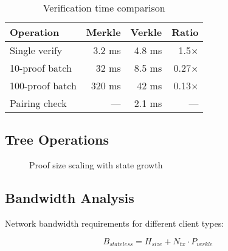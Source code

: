 \documentclass[11pt,a4paper]{article}
\theoremstyle{definition}
\begin{document}
\begin{table}[H]
\centering
\begin{tabular}{@{}lrrr@{}}
\toprule
\textbf{Operation} & \textbf{Merkle} & \textbf{Verkle} & \textbf{Ratio} \\
\midrule
Single verify & 3.2 ms & 4.8 ms & 1.5× \\
10-proof batch & 32 ms & 8.5 ms & 0.27× \\
100-proof batch & 320 ms & 42 ms & 0.13× \\
Pairing check & — & 2.1 ms & — \\
\bottomrule
\end{tabular}
\caption{Verification time comparison}
\label{tab:verification-time}
\end{table}

\subsection{Tree Operations}

\begin{figure}[H]
\centering
{}
\caption{Proof size scaling with state growth}
\label{fig:proof-scaling}
\end{figure}

\subsection{Bandwidth Analysis}

Network bandwidth requirements for different client types:

\begin{equation}
    B_{stateless} = H_{size} + N_{tx} \cdot P_{verkle}
\end{equation}
\end{document}
